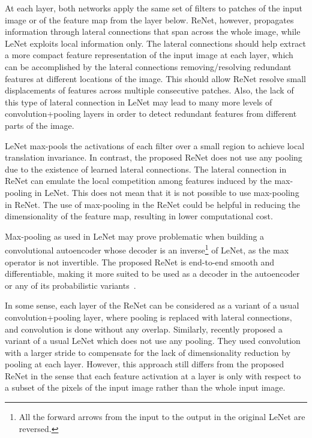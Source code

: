 At each layer, both networks apply the same set of filters to patches of the
input image or of the feature map from the layer below. ReNet, however,
propagates information through lateral connections that span across the whole
image, while LeNet exploits local information only. The lateral connections
should help extract a more compact feature representation of the input image at
each layer, which can be accomplished by the lateral connections
removing/resolving redundant features at different locations of the image. This
should allow ReNet resolve small displacements of features across multiple
consecutive patches. Also, the lack of this type of lateral connection in LeNet
may lead to many more levels of convolution+pooling layers in order to detect
redundant features from different parts of the image.

LeNet max-pools the activations of each filter over a small region to achieve
local translation invariance. In contrast, the proposed ReNet does not use any
pooling due to the existence of learned lateral connections. The lateral
connection in ReNet can emulate the local competition among features induced by
the max-pooling in LeNet.  This does not mean that it is not possible to use
max-pooling in ReNet. The use of max-pooling in the ReNet could be helpful in
reducing the dimensionality of the feature map, resulting in lower computational
cost.

Max-pooling as used in LeNet may prove problematic when building a
convolutional autoencoder whose decoder is an inverse\footnote{%
    All the forward arrows from the input to the output in the original LeNet
    are reversed.
}
of LeNet, as the max operator is not invertible. The proposed
ReNet is end-to-end smooth and differentiable, making it more suited to be used
as a decoder in the autoencoder or any of its probabilistic
variants~\citep[see e.g.,][]{Kingma+Welling-ICLR2014}.

In some sense, each layer of the ReNet can be considered as a variant of a
usual convolution+pooling layer, where pooling is replaced with lateral
connections, and convolution is done without any overlap. Similarly,
\citet{Springenberg2014} recently proposed a variant of a usual LeNet which
does not use any pooling.  They used convolution with a larger stride to
compensate for the lack of dimensionality reduction by pooling at each layer.
However, this approach still differs from the proposed ReNet in the sense that
each feature activation at a layer is only with respect to a subset of the
pixels of the input image rather than the whole input image.


